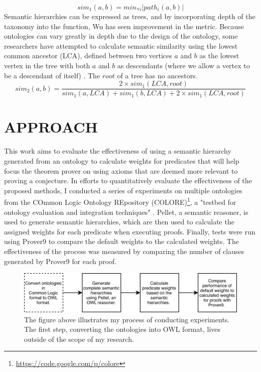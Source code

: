 \documentclass{article}
\begin{document}
\begin{equation}
sim_1(a,b)=min_{\forall i}\lvert{path_i(a,b)}\rvert
\label{rada}
\end{equation}
Semantic hierarchies can be expressed as trees, and by incorporating depth of the taxonomy into the function, Wu \cite{wu1994verbs} has seen improvement in the metric. Because ontologies can vary greatly in depth due to the design of the ontology, some researchers have attempted to calculate semantic similarity using the lowest common ancestor (LCA), defined between two vertices $a$ and $b$ as the lowest vertex in the tree with both $a$ and $b$ as descendants (where we allow a vertex to be a descendant of itself) \cite{wu1994verbs}. The $root$ of a tree has no ancestors. 
\begin{equation}
sim_2(a,b)=\frac{2 \times sim_1(LCA,root)}{sim_1(a,LCA)+sim_1(b,LCA)+2 \times sim_1(LCA,root)}
\label{wu}
\end{equation}

\newpage
\vspace*{.05in}
\section{\MakeUppercase{Approach}}
This work aims to evaluate the effectiveness of using a semantic hierarchy generated from an ontology to calculate weights for predicates that will help focus the theorem prover on using axioms that are deemed more relevant to proving a conjecture. In efforts to quantitatively evaluate the effectiveness of the proposed methods, I conducted a series of experiments on multiple ontologies from the COmmon Logic Ontology REpository (COLORE)\footnote{\url{https://code.google.com/p/colore}}, a "testbed for ontology evaluation and integration techniques" \cite{gruninger2012specifying}. Pellet, a semantic reasoner, is used to generate semantic hierarchies, which are then used to calculate the assigned weights for each predicate when executing proofs. Finally, tests were run using Prover9 to compare the default weights to the calculated weights. The effectiveness of the process was measured by comparing the number of clauses generated by Prover9 for each proof. 

\begin{figure}[h]
\centering
\includegraphics[width=6in]{flowchart}
\caption[Approach]{The figure above illustrates my process of conducting experiments. The first step, converting the ontologies into OWL format, lives outside of the scope of my research.}
\label{fig:flowchart}
\end{figure}
\end{document}
